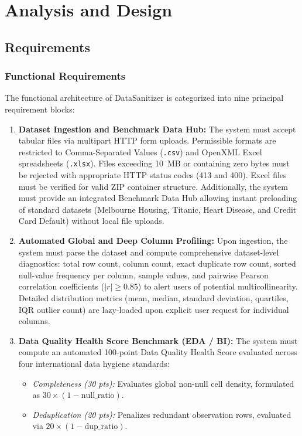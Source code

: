 \section{Analysis and Design}

\subsection{Requirements}

\subsubsection{Functional Requirements}
The functional architecture of DataSanitizer is categorized into nine principal requirement blocks:
\begin{enumerate}[label=\textbf{FR\arabic*.}]
  \item \textbf{Dataset Ingestion and Benchmark Data Hub:} The system must accept tabular files via multipart HTTP form uploads. Permissible formats are restricted to Comma-Separated Values (\texttt{.csv}) and OpenXML Excel spreadsheets (\texttt{.xlsx}). Files exceeding 10~MB or containing zero bytes must be rejected with appropriate HTTP status codes (413 and 400). Excel files must be verified for valid ZIP container structure. Additionally, the system must provide an integrated Benchmark Data Hub allowing instant preloading of standard datasets (Melbourne Housing, Titanic, Heart Disease, and Credit Card Default) without local file uploads.
  \item \textbf{Automated Global and Deep Column Profiling:} Upon ingestion, the system must parse the dataset and compute comprehensive dataset-level diagnostics: total row count, column count, exact duplicate row count, sorted null-value frequency per column, sample values, and pairwise Pearson correlation coefficients ($|r| \ge 0.85$) to alert users of potential multicollinearity. Detailed distribution metrics (mean, median, standard deviation, quartiles, IQR outlier count) are lazy-loaded upon explicit user request for individual columns.
  \item \textbf{Data Quality Health Score Benchmark (EDA / BI):} The system must compute an automated 100-point Data Quality Health Score evaluated across four international data hygiene standards:
  \begin{itemize}
    \item \emph{Completeness (30 pts):} Evaluates global non-null cell density, formulated as $30 \times (1 - \text{null\_ratio})$.
    \item \emph{Deduplication (20 pts):} Penalizes redundant observation rows, evaluated via $20 \times (1 - \text{dup\_ratio})$.

\end{itemize}
\end{enumerate}
